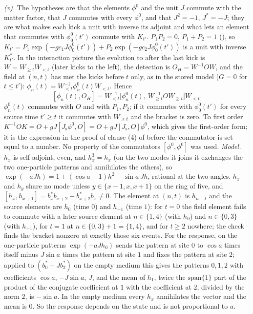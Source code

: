 \emph{(v).} The hypotheses are that the elements $\phi^{0}$ and the unit $J$ commute with the matter factor, that $J$ commutes with every $\phi^{0}$, and that $J^{2} = -1$, $J^{*} = -J$; they are what makes each kick a unit with inverse its adjoint and what lets an element that commutes with $\phi^{0}_{0}(t')$ commute with $K_{t'}$. $P_{1}P_{2} = 0$, $P_{1} + P_{2} = 1$ (), so $K_{t'} = P_{1}\exp(-gc_{1}J\phi^{0}_{0}(t')) + P_{2}\exp(-gc_{2}J\phi^{0}_{0}(t'))$ is a unit with inverse $K_{t'}^{*}$. In the interaction picture the evolution to after the last kick is $W = W_{\ge t}W_{<t}$ (later kicks to the left), the detection is $O_{H} = W^{-1}OW$, and the field at $(n, t)$ has met the kicks before $t$ only, as in the stored model ($G = 0$ for $t \le t'$): $\phi_{n}(t) = W_{<t}^{-1}\phi^{0}_{n}(t)W_{<t}$. Hence
\[
[\phi_{n}(t), O_{H}] = W_{<t}^{-1}\bigl[\phi^{0}_{n}(t),\ W_{\ge t}^{-1}OW_{\ge t}\bigr]W_{<t} .
\]
$\phi^{0}_{n}(t)$ commutes with $O$ and with $P_{1}, P_{2}$; if it commutes with $\phi^{0}_{0}(t')$ for every source time $t' \ge t$ it commutes with $W_{\ge t}$ and the bracket is zero. To first order $K^{-1}OK = O + gJ[J_{\mathrm{s}}\phi^{0}, O] = O + gJ[J_{\mathrm{s}}, O]\phi^{0}$, which gives the first-order form; it is the expression in the proof of clause (4) of  before the commutator is set equal to a number. No property of the commutators $[\phi^{0}, \phi^{0}]$ was used. \emph{Model.} $h_{x}$ is self-adjoint, even, and $h_{x}^{3} = h_{x}$ (on the two modes it joins it exchanges the two one-particle patterns and annihilates the others), so $\exp(-aJh) = 1 + (\cos a - 1)h^{2} - \sin a\,Jh$, rational at the two angles. $h_{x}$ and $h_{y}$ share no mode unless $y \in \{x - 1, x, x + 1\}$ on the ring of five, and $[h_{x}, h_{x+1}] = b_{x}^{*}b_{x+2} - b_{x+2}^{*}b_{x} \ne 0$. The element at $(n, t)$ is $h_{n-t}$ and the source elements are $h_{0}$ (time $0$) and $h_{-1}$ (time $1$): for $t = 0$ the field element fails to commute with a later source element at $n \in \{1, 4\}$ (with $h_{0}$) and $n \in \{0, 3\}$ (with $h_{-1}$), for $t = 1$ at $n \in \{0, 3\} + 1 = \{1, 4\}$, and for $t \ge 2$ nowhere; the check finds the bracket nonzero at exactly those six events. For the response, on the one-particle patterns $\exp(-aJh_{0})$ sends the pattern at site $0$ to $\cos a$ times itself minus $J\sin a$ times the pattern at site $1$ and fixes the pattern at site $2$; applied to $(b_{0}^{*} + Jb_{2}^{*})$ on the empty medium this gives the patterns $0, 1, 2$ with coefficients $\cos a$, $-J\sin a$, $J$, and the mean of $h_{1}$, twice the $\mathrm{span}\{1\}$ part of the product of the conjugate coefficient at $1$ with the coefficient at $2$, divided by the norm $2$, is $-\sin a$. In the empty medium every $h_{x}$ annihilates the vector and the mean is $0$. So the response depends on the state and is not proportional to $a$.

